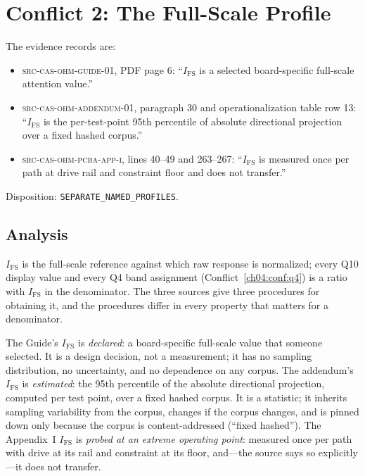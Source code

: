 \section{Conflict 2: The Full-Scale Profile}\label{ch04:ifs}

\begin{conflict}\label{ch04:conf:ifs}
The evidence records are:
\begin{itemize}
\item \textsc{src-cas-ohm-guide-01}, PDF page 6: ``$I_{\mathrm{FS}}$ is a
selected board-specific full-scale attention value.''
\item \textsc{src-cas-ohm-addendum-01}, paragraph 30 and operationalization
table row 13: ``$I_{\mathrm{FS}}$ is the per-test-point 95th percentile of
absolute directional projection over a fixed hashed corpus.''
\item \textsc{src-cas-ohm-pcba-app-i}, lines 40--49 and 263--267:
``$I_{\mathrm{FS}}$ is measured once per path at drive rail and constraint
floor and does not transfer.''
\end{itemize}
Disposition: \texttt{SEPARATE\_NAMED\_PROFILES}.
\end{conflict}

\subsection{Analysis}

$I_{\mathrm{FS}}$ is the full-scale reference against which raw response is
normalized; every Q10 display value and every Q4 band assignment
(Conflict~\ref{ch04:conf:q4}) is a ratio with $I_{\mathrm{FS}}$ in the
denominator. The three sources give three procedures for obtaining it, and
the procedures differ in every property that matters for a denominator.

The Guide's $I_{\mathrm{FS}}$ is \emph{declared}: a board-specific full-scale
value that someone selected. It is a design decision, not a measurement; it
has no sampling distribution, no uncertainty, and no dependence on any
corpus. The addendum's $I_{\mathrm{FS}}$ is \emph{estimated}: the 95th
percentile of the absolute directional projection, computed per test point,
over a fixed hashed corpus. It is a statistic; it inherits sampling
variability from the corpus, changes if the corpus changes, and is pinned
down only because the corpus is content-addressed (``fixed hashed''). The
Appendix~I $I_{\mathrm{FS}}$ is \emph{probed at an extreme operating point}:
measured once per path with drive at its rail and constraint at its floor,
and---the source says so explicitly---it does not transfer.

